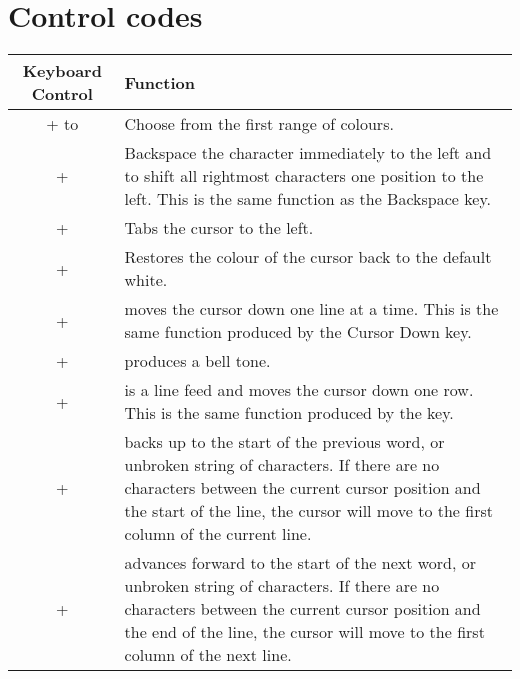 \newpage



\section{Control codes}
\label{appendix:controlcodes}

\begin{center}
\begin{longtable}{c|L{5.5cm}}
	\textbf{Keyboard Control} & \textbf{Function}\\
   \hline
	\endhead

 +  to  &
Choose from the first range of colours.\\

 +  &
Backspace the character immediately to the left and to shift all rightmost characters one position to the left. This is the same function as the Backspace key.\\

 +  &
Tabs the cursor to the left.\\

 +  &
Restores the colour of the cursor back to the default white.\\

 +  &
moves the cursor down one line at a time. This is the same function produced by the Cursor Down key.\\

 +  &
produces a bell tone.\\

 +  &
is a line feed and moves the cursor down one row. This is the same function produced by the \megakey{$\downarrow$} key.\\

 +  &
backs up to the start of the previous word, or unbroken string of characters. If there are no characters between the current cursor position and the start of the line, the cursor will move to the first column of the current line.\\

 +  &
advances forward to the start of the next word, or unbroken string of characters. If there are no characters between the current cursor position and the end of the line, the cursor will move to the first column of the next line.\\


\end{longtable}
\end{center}
